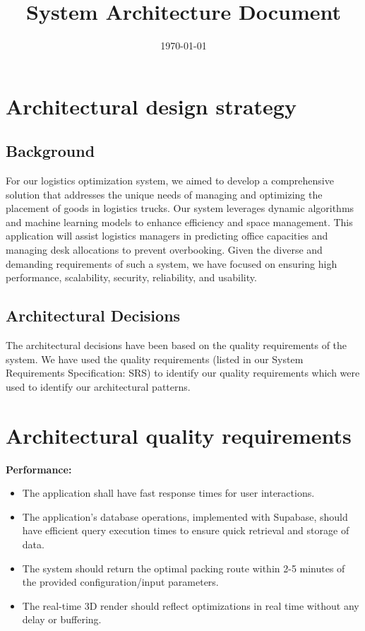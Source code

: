 \documentclass{article}
\title{System Architecture Document}
\date{\today}
\begin{document}
\maketitle

\section{Architectural design strategy}

\subsection{Background}
For our logistics optimization system, we aimed to develop a comprehensive solution that addresses the unique needs of managing and optimizing the placement of goods in logistics trucks. Our system leverages dynamic algorithms and machine learning models to enhance efficiency and space management. This application will assist logistics managers in predicting office capacities and managing desk allocations to prevent overbooking. Given the diverse and demanding requirements of such a system, we have focused on ensuring high performance, scalability, security, reliability, and usability.

\subsection{Architectural Decisions}
The architectural decisions have been based on the quality requirements of the system. We have used the quality requirements (listed in our System Requirements Specification: SRS) to identify our quality requirements which were used to identify our architectural patterns.

\section{Architectural quality requirements}

\textbf{Performance:}
\begin{itemize}
    \item The application shall have fast response times for user interactions.
    \item The application's database operations, implemented with Supabase, should have efficient query execution times to ensure quick retrieval and storage of data.
    \item The system should return the optimal packing route within 2-5 minutes of the provided configuration/input parameters.
    \item The real-time 3D render should reflect optimizations in real time without any delay or buffering.
\end{itemize}
\end{document}
